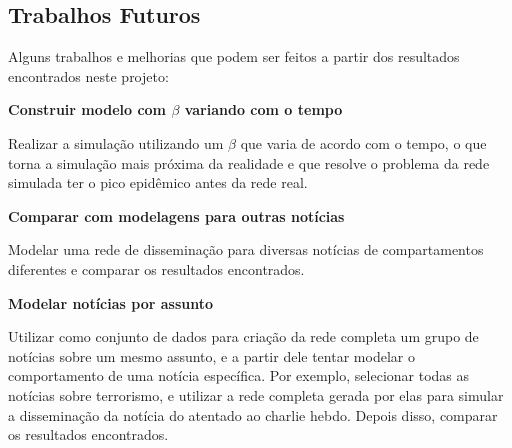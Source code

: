 \documentclass[a4paper,12pt]{article}
\begin{document}
\subsection{Trabalhos Futuros}

Alguns trabalhos e melhorias que podem ser feitos a partir dos resultados encontrados neste projeto:

\begin{description}
 \item \textbf{Construir modelo com $\beta$ variando com o tempo}
 
 Realizar a simulação utilizando um $\beta$ que varia de acordo com o tempo, o que torna a simulação mais próxima da realidade e que
 resolve o problema da rede simulada ter o pico epidêmico antes da rede real.
 
 \item \textbf{Comparar com modelagens para outras notícias}
 
 Modelar uma rede de disseminação para diversas notícias de compartamentos diferentes e comparar os resultados encontrados.
 
 \item \textbf{Modelar notícias por assunto}
 
 Utilizar como conjunto de dados para criação da rede completa um grupo de notícias sobre um mesmo assunto, e a partir dele
 tentar modelar o comportamento de uma notícia específica. Por exemplo, selecionar todas as notícias sobre terrorismo, e utilizar
 a rede completa gerada por elas para simular a disseminação da notícia do atentado ao charlie hebdo. Depois disso, comparar os resultados
 encontrados.
\end{description}

\clearpage

{}


\end{document}
